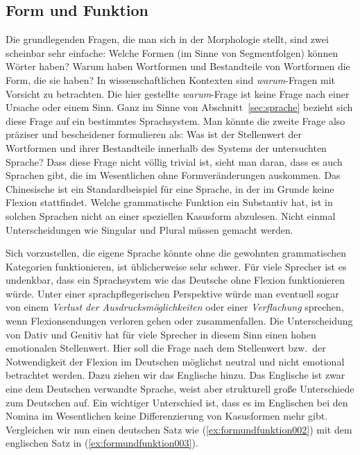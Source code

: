 \subsection{Form und Funktion}
\label{sec:formundfunktion}

Die grundlegenden Fragen, die man sich in der Morphologie stellt, sind zwei scheinbar sehr einfache:
Welche Formen (im Sinne von Segmentfolgen) können Wörter haben?
Warum haben Wortformen und Bestandteile von Wortformen die Form, die sie haben?
In wissenschaftlichen Kontexten sind \textit{warum}-Fragen mit Vorsicht zu betrachten.
Die hier gestellte \textit{warum}-Frage ist keine Frage nach einer Ursache oder einem Sinn.
Ganz im Sinne von Abschnitt~\ref{sec:sprache} bezieht sich diese Frage auf ein bestimmtes Sprachsystem.
Man könnte die zweite Frage also präziser und bescheidener formulieren als:
Was ist der Stellenwert der Wortformen und ihrer Bestandteile innerhalb des Systems der untersuchten Sprache?
Dass diese Frage nicht völlig trivial ist, sieht man daran, dass es auch Sprachen gibt, die im Wesentlichen ohne Formveränderungen auskommen.
Das Chinesische ist ein Standardbeispiel für eine Sprache, in der im Grunde keine Flexion stattfindet.
Welche grammatische Funktion \zB ein Substantiv hat, ist in solchen Sprachen nicht an einer speziellen Kasusform abzulesen.
Nicht einmal Unterscheidungen wie Singular und Plural müssen gemacht werden.

Sich vorzustellen, die eigene Sprache könnte ohne die gewohnten grammatischen Kategorien funktionieren, ist üblicherweise sehr schwer.
Für viele Sprecher ist es \zB undenkbar, dass ein Sprachsystem wie das Deutsche ohne Flexion funktionieren würde.
Unter einer sprachpflegerischen Perspektive würde man eventuell sogar von einem \textit{Verlust der Ausdrucksmöglichkeiten} oder einer \textit{Verflachung} sprechen, wenn Flexionsendungen verloren gehen oder zusammenfallen.
Die Unterscheidung von Dativ und Genitiv hat für viele Sprecher in diesem Sinn einen hohen emotionalen Stellenwert.
Hier soll die Frage nach dem Stellenwert bzw.\ der Notwendigkeit der Flexion im Deutschen möglichst neutral und nicht emotional betrachtet werden.
Dazu ziehen wir das Englische hinzu.
Das Englische ist zwar eine dem Deutschen verwandte Sprache, weist aber strukturell große Unterschiede zum Deutschen auf.
Ein wichtiger Unterschied ist, dass es im Englischen bei den Nomina im Wesentlichen keine Differenzierung von Kasusformen mehr gibt.
Vergleichen wir nun einen deutschen Satz wie (\ref{ex:formundfunktion002}) mit dem englischen Satz in (\ref{ex:formundfunktion003}).

